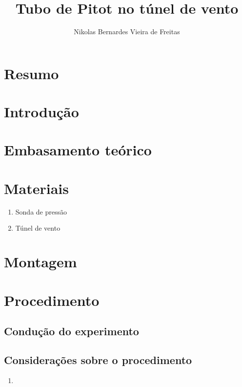 \documentclass[a4paper]{article}
\title{Tubo de Pitot no túnel de vento}
\author{Nikolas Bernardes Vieira de Freitas}
\begin{document}
\maketitle

\section{Resumo}


\section{Introdução}

\section{Embasamento teórico}

\section{Materiais}
    \begin{enumerate}[label=(\roman*)]
        \item Sonda de pressão
        \item Túnel de vento
    \end{enumerate}

\section{Montagem}


\section{Procedimento}

\subsection{Condução do experimento}

 \subsection{Considerações sobre o procedimento}
  \begin{enumerate}
      \item
  \end{enumerate}
\end{document}
